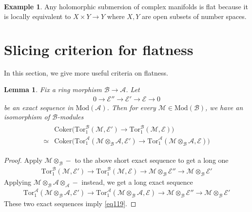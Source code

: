 \documentclass[12pt,b5paper,notitlepage]{report}
\theoremstyle{definition}
\newtheorem{eg}[df]{Example}
\theoremstyle{plain}
\newtheorem{lm}[df]{Lemma}
\newcommand{\mc}{\mathcal}
\newcommand{\Cok}{\mathrm{Coker}}
\newcommand{\Tor}{\mathrm{Tor}}
\newcommand{\Mod}{\mathrm{Mod}}
\numberwithin{equation}{section}
\begin{document}
\begin{eg}
Any holomorphic submersion of complex manifolds is flat because it is locally equivalent to $X\times Y\rightarrow Y$ where $X,Y$ are open subsets of number spaces.
\end{eg}











\section{Slicing criterion for flatness}\label{lb277}



In this section, we give more useful criteria on flatness.

\begin{lm}\label{lb261}
Fix a ring morphism $\mc B\rightarrow\mc A$. Let
\begin{align*}
0\rightarrow\mc E''\rightarrow\mc E'\rightarrow\mc E\rightarrow0
\end{align*}
be an exact sequence in $\Mod(\mc A)$. Then for every $\mc M\in\Mod(\mc B)$, we have an isomorphism of $\mc B$-modules
\begin{align}\label{eq119}
\begin{aligned}
&\Cok\Big(\Tor_1^{\mc B}(\mc M,\mc E')\rightarrow\Tor_1^{\mc B}(\mc M,\mc E) \Big)\\
\simeq&\Cok\Big(\Tor_1^{\mc A}(\mc M\otimes_{\mc B}\mc A,\mc E')\rightarrow\Tor_1^{\mc A}(\mc M\otimes_{\mc B}\mc A,\mc E) \Big)
\end{aligned}
\end{align}
\end{lm}




\begin{proof}
Apply $\mc M\otimes_{\mc B}-$ to the above short exact sequence to get a long one
\begin{align*}
\Tor_1^{\mc B}(\mc M,\mc E')\rightarrow\Tor_1^{\mc B}(\mc M,\mc E)\rightarrow\mc M\otimes_{\mc B}\mc E''\rightarrow\mc M\otimes_{\mc B}\mc E'
\end{align*}
Applying $\mc M\otimes_{\mc B}\mc A\otimes_{\mc A}-$ instead, we get a long exact sequence
\begin{align*}
\Tor_1^{\mc A}(\mc M\otimes_{\mc B}\mc A,\mc E')\rightarrow\Tor_1^{\mc A}(\mc M\otimes_{\mc B}\mc A,\mc E)\rightarrow\mc M\otimes_{\mc B}\mc E''\rightarrow\mc M\otimes_{\mc B}\mc E'
\end{align*}
These two exact sequences imply \eqref{eq119}.
\end{proof}
\end{document}
